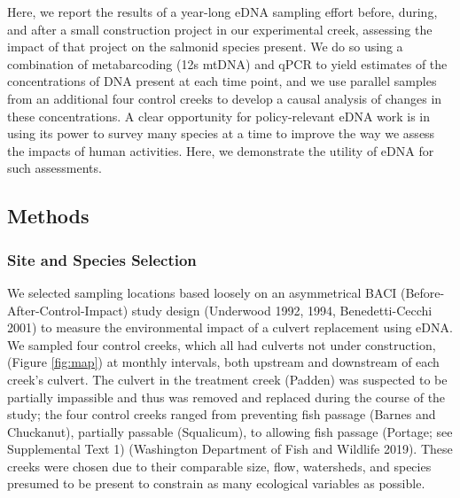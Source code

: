 \documentclass[
]{article}
\begin{document}
Here, we report the results of a year-long eDNA sampling effort before,
during, and after a small construction project in our experimental
creek, assessing the impact of that project on the salmonid species
present. We do so using a combination of metabarcoding (12s mtDNA) and
qPCR to yield estimates of the concentrations of DNA present at each
time point, and we use parallel samples from an additional four control
creeks to develop a causal analysis of changes in these concentrations.
A clear opportunity for policy-relevant eDNA work is in using its power
to survey many species at a time to improve the way we assess the
impacts of human activities. Here, we demonstrate the utility of eDNA
for such assessments.

\hypertarget{methods}{%
\subsection{Methods}\label{methods}}

\hypertarget{site-and-species-selection}{%
\subsubsection{Site and Species
Selection}\label{site-and-species-selection}}

We selected sampling locations based loosely on an asymmetrical BACI
(Before-After-Control-Impact) study design (Underwood 1992, 1994,
Benedetti-Cecchi 2001) to measure the environmental impact of a culvert
replacement using eDNA. We sampled four control creeks, which all had
culverts not under construction, (Figure \ref{fig:map}) at monthly
intervals, both upstream and downstream of each creek's culvert. The
culvert in the treatment creek (Padden) was suspected to be partially
impassible and thus was removed and replaced during the course of the
study; the four control creeks ranged from preventing fish passage
(Barnes and Chuckanut), partially passable (Squalicum), to allowing fish
passage (Portage; see Supplemental Text 1) (Washington Department of
Fish and Wildlife 2019). These creeks were chosen due to their
comparable size, flow, watersheds, and species presumed to be present to
constrain as many ecological variables as possible.
\end{document}
